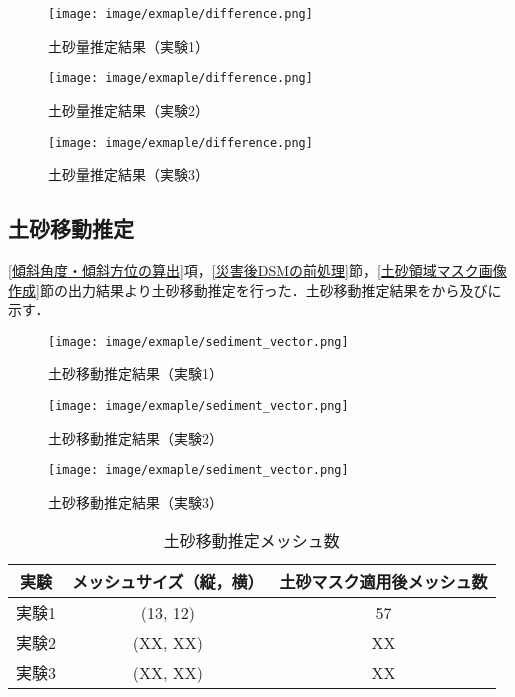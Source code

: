       \begin{figure}[t]
        \centering
        \texttt{[image: image/exmaple/difference.png]}
        \caption{土砂量推定結果（実験1）}
        \label{土砂量推定結果（実験1）}
      \end{figure}

      \begin{figure}[t]
        \centering
        \texttt{[image: image/exmaple/difference.png]}
        \caption{土砂量推定結果（実験2）}
      \end{figure}

      \begin{figure}[t]
        \centering
        \texttt{[image: image/exmaple/difference.png]}
        \caption{土砂量推定結果（実験3）}
        \label{土砂量推定結果（実験3）}
      \end{figure}


    \subsection*{土砂移動推定}
      \ref{傾斜角度・傾斜方位の算出}項，\ref{災害後DSMの前処理}節，\ref{土砂領域マスク画像作成}節の出力結果より土砂移動推定を行った．土砂移動推定結果をから及びに示す．

      \begin{figure}[t]
        \centering
        \texttt{[image: image/exmaple/sediment\_vector.png]}
        \caption{土砂移動推定結果（実験1）}
        \label{土砂移動推定結果（実験1）}
      \end{figure}

      \begin{figure}[t]
        \centering
        \texttt{[image: image/exmaple/sediment\_vector.png]}
        \caption{土砂移動推定結果（実験2）}
      \end{figure}

      \begin{figure}[t]
        \centering
        \texttt{[image: image/exmaple/sediment\_vector.png]}
        \caption{土砂移動推定結果（実験3）}
        \label{土砂移動推定結果（実験3）}
      \end{figure}

      \begin{table}[b]
        \centering
        \caption{土砂移動推定メッシュ数}
        \label{土砂移動推定メッシュ数}
        \begin{tabular}{ccc}
          \hline
          \textbf{実験} & \textbf{メッシュサイズ（縦，横）} & \textbf{土砂マスク適用後メッシュ数} \\
          \hline  \hline
          実験1 & (13, 12) & 57 \\
          実験2 & (XX, XX) & XX \\
          実験3 & (XX, XX) & XX \\ \hline
        \end{tabular}
      \end{table}


